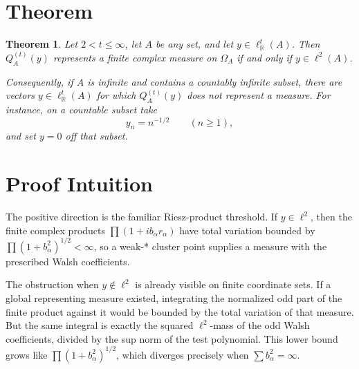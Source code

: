 \documentclass[11pt]{article}
\newtheorem{theorem}{Theorem}
\newcommand{\R}{\mathbb R}
\begin{document}
\section*{Theorem}

\begin{theorem}
Let \(2<t\le\infty\), let \(A\) be any set, and let
\(y\in \ell^t_{\R}(A)\).  Then \(Q_A^{(t)}(y)\) represents a finite complex
measure on \(\Omega_A\) if and only if \(y\in \ell^2(A)\).

Consequently, if \(A\) is infinite and contains a countably infinite subset,
there are vectors \(y\in \ell^t_{\R}(A)\) for which \(Q_A^{(t)}(y)\) does not
represent a measure.  For instance, on a countable subset take
\[
  y_n=n^{-1/2}\qquad(n\ge1),
\]
and set \(y=0\) off that subset.
\end{theorem}

\section*{Proof Intuition}

The positive direction is the familiar Riesz-product threshold.  If
\(y\in\ell^2\), then the finite complex products
\(\prod(1+i b_\alpha r_\alpha)\) have total variation bounded by
\(\prod(1+b_\alpha^2)^{1/2}<\infty\), so a weak-* cluster point supplies a
measure with the prescribed Walsh coefficients.

The obstruction when \(y\notin\ell^2\) is already visible on finite coordinate
sets.  If a global representing measure existed, integrating the normalized
odd part of the finite product against it would be bounded by the total
variation of that measure.  But the same integral is exactly the squared
\(\ell^2\)-mass of the odd Walsh coefficients, divided by the sup norm of the
test polynomial.  This lower bound grows like
\(\prod(1+b_\alpha^2)^{1/2}\), which diverges precisely when
\(\sum b_\alpha^2=\infty\).
\end{document}
